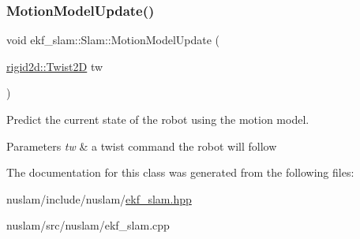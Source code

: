 \subsubsection{\texorpdfstring{Motion\+Model\+Update()}{MotionModelUpdate()}}
{\footnotesize\ttfamily void ekf\+\_\+slam\+::\+Slam\+::\+Motion\+Model\+Update (\begin{DoxyParamCaption}\item[{\hyperlink{structrigid2d_1_1Twist2D}{rigid2d\+::\+Twist2D}}]{tw }\end{DoxyParamCaption})}



Predict the current state of the robot using the motion model. 


\begin{DoxyParams}{Parameters}
{\em tw} & a twist command the robot will follow \\
\hline
\end{DoxyParams}


The documentation for this class was generated from the following files\+:\begin{DoxyCompactItemize}
\item 
nuslam/include/nuslam/\hyperlink{ekf__slam_8hpp}{ekf\+\_\+slam.\+hpp}\item 
nuslam/src/nuslam/ekf\+\_\+slam.\+cpp\end{DoxyCompactItemize}
